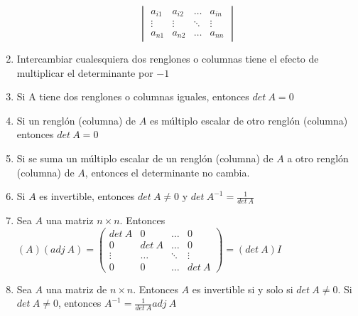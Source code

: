 \documentclass[12pt]{article}
\theoremstyle{plain}
\theoremstyle{definition}
\begin{document}
\begin{enumerate}
\[\begin{vmatrix}
            a_{i1}& a_{i2}&\dots &a_{in}\\\vdots & \vdots & \ddots & \vdots\\ a_{n1}& a_{n2}& \dots & a_{nn}\end{vmatrix}\]
            \item Intercambiar cualesquiera dos renglones o columnas tiene el efecto de multiplicar el determinante por $-1$
            \item Si A tiene dos renglones o columnas iguales, entonces $det\ A=0$
            \item Si un renglón (columna) de $A$ es múltiplo escalar de otro renglón (columna) entonces $det\ A=0$
            \item Si se suma un múltiplo escalar de un renglón (columna) de $A$ a otro renglón (columna) de $A$, entonces el determinante no cambia.
            \item Si $A$ es invertible, entonces $det\ A\neq0$ y $det\ A^{-1}=\frac{1}{det\ A}$
            \item Sea $A$ una matriz $n\times n$. Entonces $(A)(adj\ A)=\begin{pmatrix} det\ A & 0& \dots & 0\\0& det\ A& \dots &0 \\ \vdots & \dots & \ddots & \vdots\\ 0& 0 & \dots & det\ A\end{pmatrix}=(det\ A)I$
            \item Sea $A$ una matriz de $n\times n$. Entonces $A$ es invertible si y solo si $det\ A\neq0$. Si $det\ A\neq0$, entonces $A^{-1}=\frac{1}{det\ A}adj\ A$
        \end{enumerate}
        
\end{document}
